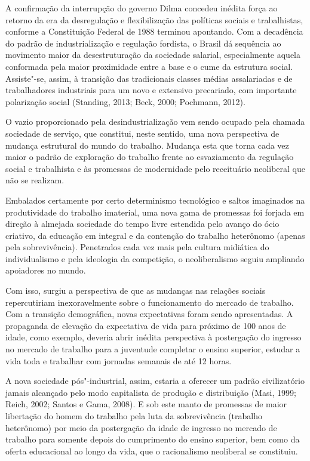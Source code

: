A confirmação da interrupção do governo Dilma concedeu inédita força ao
retorno da era da desregulação e flexibilização das políticas sociais e
trabalhistas, conforme a Constituição Federal de 1988 terminou
apontando. Com a decadência do padrão de industrialização e regulação
fordista, o Brasil dá sequência ao movimento maior da desestruturação da
sociedade salarial, especialmente aquela conformada pela maior
proximidade entre a base e o cume da estrutura social. Assiste"-se,
assim, à transição das tradicionais classes médias assalariadas e de
trabalhadores industriais para um novo e extensivo precariado, com
importante polarização social (Standing, 2013; Beck, 2000; Pochmann,
2012).

O vazio proporcionado pela desindustrialização vem sendo ocupado pela
chamada sociedade de serviço, que constitui, neste sentido, uma nova
perspectiva de mudança estrutural do mundo do trabalho. Mudança esta que
torna cada vez maior o padrão de exploração do trabalho frente ao
esvaziamento da regulação social e trabalhista e às promessas de
modernidade pelo receituário neoliberal que não se realizam.

Embalados certamente por certo determinismo tecnológico e saltos
imaginados na produtividade do trabalho imaterial, uma nova gama de
promessas foi forjada em direção à almejada sociedade do tempo livre
estendida pelo avanço do ócio criativo, da educação em integral e da
contenção do trabalho heterônomo (apenas pela sobrevivência). Penetrados
cada vez mais pela cultura midiática do individualismo e pela ideologia
da competição, o neoliberalismo seguiu ampliando apoiadores no mundo.

Com isso, surgiu a perspectiva de que as mudanças nas relações sociais
repercutiriam inexoravelmente sobre o funcionamento do mercado de
trabalho. Com a transição demográfica, novas expectativas foram sendo
apresentadas. A propaganda de elevação da expectativa de vida para
próximo de 100 anos de idade, como exemplo, deveria abrir inédita
perspectiva à postergação do ingresso no mercado de trabalho para a
juventude completar o ensino superior, estudar a vida toda e trabalhar
com jornadas semanais de até 12 horas.

A nova sociedade pós"-industrial, assim, estaria a oferecer um padrão
civilizatório jamais alcançado pelo modo capitalista de produção e
distribuição (Masi, 1999; Reich, 2002; Santos e Gama, 2008). E sob este
manto de promessas de maior libertação do homem do trabalho pela luta da
sobrevivência (trabalho heterônomo) por meio da postergação da idade de
ingresso no mercado de trabalho para somente depois do cumprimento do
ensino superior, bem como da oferta educacional ao longo da vida, que o
racionalismo neoliberal se constituiu.

